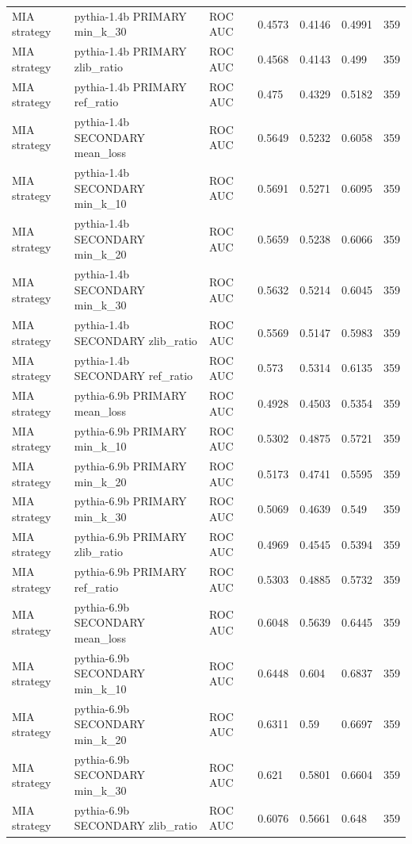 \begin{tabular}{lllllll}
MIA strategy & pythia-1.4b PRIMARY min\_k\_30 & ROC AUC & 0.4573 & 0.4146 & 0.4991 & 359 \\
MIA strategy & pythia-1.4b PRIMARY zlib\_ratio & ROC AUC & 0.4568 & 0.4143 & 0.499 & 359 \\
MIA strategy & pythia-1.4b PRIMARY ref\_ratio & ROC AUC & 0.475 & 0.4329 & 0.5182 & 359 \\
MIA strategy & pythia-1.4b SECONDARY mean\_loss & ROC AUC & 0.5649 & 0.5232 & 0.6058 & 359 \\
MIA strategy & pythia-1.4b SECONDARY min\_k\_10 & ROC AUC & 0.5691 & 0.5271 & 0.6095 & 359 \\
MIA strategy & pythia-1.4b SECONDARY min\_k\_20 & ROC AUC & 0.5659 & 0.5238 & 0.6066 & 359 \\
MIA strategy & pythia-1.4b SECONDARY min\_k\_30 & ROC AUC & 0.5632 & 0.5214 & 0.6045 & 359 \\
MIA strategy & pythia-1.4b SECONDARY zlib\_ratio & ROC AUC & 0.5569 & 0.5147 & 0.5983 & 359 \\
MIA strategy & pythia-1.4b SECONDARY ref\_ratio & ROC AUC & 0.573 & 0.5314 & 0.6135 & 359 \\
MIA strategy & pythia-6.9b PRIMARY mean\_loss & ROC AUC & 0.4928 & 0.4503 & 0.5354 & 359 \\
MIA strategy & pythia-6.9b PRIMARY min\_k\_10 & ROC AUC & 0.5302 & 0.4875 & 0.5721 & 359 \\
MIA strategy & pythia-6.9b PRIMARY min\_k\_20 & ROC AUC & 0.5173 & 0.4741 & 0.5595 & 359 \\
MIA strategy & pythia-6.9b PRIMARY min\_k\_30 & ROC AUC & 0.5069 & 0.4639 & 0.549 & 359 \\
MIA strategy & pythia-6.9b PRIMARY zlib\_ratio & ROC AUC & 0.4969 & 0.4545 & 0.5394 & 359 \\
MIA strategy & pythia-6.9b PRIMARY ref\_ratio & ROC AUC & 0.5303 & 0.4885 & 0.5732 & 359 \\
MIA strategy & pythia-6.9b SECONDARY mean\_loss & ROC AUC & 0.6048 & 0.5639 & 0.6445 & 359 \\
MIA strategy & pythia-6.9b SECONDARY min\_k\_10 & ROC AUC & 0.6448 & 0.604 & 0.6837 & 359 \\
MIA strategy & pythia-6.9b SECONDARY min\_k\_20 & ROC AUC & 0.6311 & 0.59 & 0.6697 & 359 \\
MIA strategy & pythia-6.9b SECONDARY min\_k\_30 & ROC AUC & 0.621 & 0.5801 & 0.6604 & 359 \\
MIA strategy & pythia-6.9b SECONDARY zlib\_ratio & ROC AUC & 0.6076 & 0.5661 & 0.648 & 359 \\

\end{tabular}
